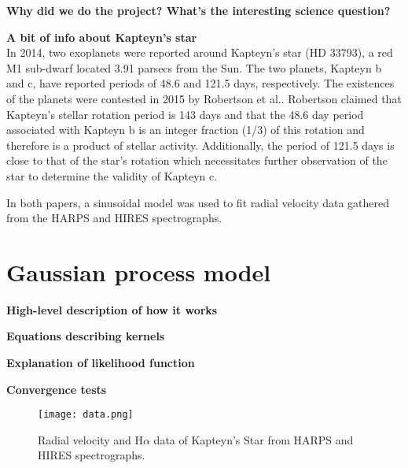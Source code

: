 \documentclass{aastex6}
\begin{document}
\textbf{Why did we do the project? What's the interesting science
question?}

\textbf{A bit of info about Kapteyn's star}\\

In 2014, two exoplanets were reported around Kapteyn's star (HD 33793), a red M1 sub-dwarf located 3.91 parsecs from the Sun.
The two planets, Kapteyn b and c, have reported periods of 48.6 and 121.5 days, respectively. The existences of the planets were contested in 2015 by Robertson et al..
Robertson claimed that Kapteyn's stellar rotation period is 143 days and that the 48.6 day period associated with Kapteyn b is an integer fraction (1/3) of this rotation and therefore is a product of stellar activity.
Additionally, the period of 121.5 days is close to that of the star's rotation which necessitates further observation of the star to determine the validity of Kapteyn c. \par
In both papers, a sinusoidal model was used to fit radial velocity data gathered from the HARPS and HIRES spectrographs.

\section{Gaussian process model}\label{sec:GP}

\textbf{High-level description of how it works}

\textbf{Equations describing kernels}

\textbf{Explanation of likelihood function}

\textbf{Convergence tests}

\begin{figure} \label{fig:data}
    \begin{center}
    \texttt{[image: data.png]}
    \caption{Radial velocity and H$\alpha$ data of Kapteyn's Star from HARPS and HIRES spectrographs. }
     \end{center}
\end{figure}
\end{document}
